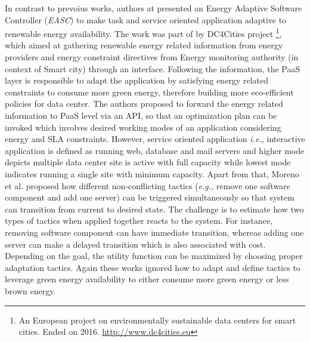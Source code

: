 In contrast to prevoius works, authors at \cite{corentin} presented an Energy Adaptive Software Controller (\emph{EASC}) to make task and service oriented application adaptive to renewable energy availability. The work was part of by DC4Cities project \footnote{An European project on environmentally sustainable data centers for smart cities. Ended on 2016. \url{http://www.dc4cities.eu}}, which aimed at gathering renewable energy related information from energy providers and energy constraint directives from Energy monitoring authority (in context of Smart city) through an interface. Following the information, the PaaS layer is responsible to adapt the application by satisfying energy related constraints to consume more green energy, therefore building more eco-efficient policies for data center. The authors proposed to forward the energy related information to PaaS level via an API, so that an optimization plan can be invoked which involves desired working modes of an application considering energy and SLA constraints. However, service oriented application \emph{i.e.,} interactive application is defined as running web, database and mail servers and higher mode depicts multiple data center site is active with full capacity while lowest mode indicates running a single site with minimum capacity. Apart from that, Moreno et al. \cite{garlan1} proposed how different non-conflicting tactics (\emph{e.g.,} remove one software component and add one server) can be triggered simultaneously so that system can transition from current to desired state. The challenge is to estimate how two types of tactics when applied together reacts to the system. For instance, removing software component can have immediate transition, whereas adding one server can make a delayed transition which is also associated with cost. Depending on the goal, the utility function can be maximized by choosing proper adaptation tactics. Again these works ignored how to adapt and define tactics to leverage green energy availability to either consume more green energy or less brown energy.

